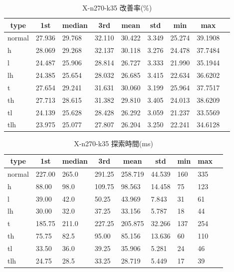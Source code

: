 \begin{table}[htbp]
    \caption{X-n270-k35 改善率(\%)}
    \begin{tabular}{|l|l|l|l|l|l|l|l|l|}\hline
    \multicolumn{1}{|c|}{\textbf{type}}
    &\multicolumn{1}{|c|}{\textbf{1st}}
    &\multicolumn{1}{c|}{\textbf{median}}
    &\multicolumn{1}{c|}{\textbf{3rd}}
    &\multicolumn{1}{c|}{\textbf{mean}}
    &\multicolumn{1}{c|}{\textbf{std}}
    &\multicolumn{1}{c|}{\textbf{min}}
    &\multicolumn{1}{c|}{\textbf{max}}\\\hline
	normal & 27.936 & 29.768 & 32.110 & 30.422 & 3.349 & 25.274 & 39.1908\\\hline
	h & 28.069 & 29.268 & 32.137 & 30.118 & 3.276 & 24.478 & 37.7484\\\hline
	l & 24.487 & 25.906 & 28.814 & 26.727 & 3.333 & 21.990 & 35.1944\\\hline
	lh & 24.385 & 25.654 & 28.032 & 26.685 & 3.415 & 22.634 & 36.6202\\\hline
	t & 27.654 & 29.241 & 31.631 & 30.060 & 3.199 & 25.964 & 37.7517\\\hline
	th & 27.713 & 28.615 & 31.382 & 29.810 & 3.405 & 24.013 & 38.6209\\\hline
	tl & 24.139 & 25.628 & 28.428 & 26.292 & 3.059 & 21.237 & 33.5569\\\hline
	tlh & 23.975 & 25.077 & 27.807 & 26.204 & 3.250 & 22.241 & 34.6128\\\hline
	\end{tabular}
\end{table}
\begin{table}[htbp]
    \caption{X-n270-k35 探索時間(ms)}
    \begin{tabular}{|l|l|l|l|l|l|l|l|l|}\hline
    \multicolumn{1}{|c|}{\textbf{type}}
    &\multicolumn{1}{|c|}{\textbf{1st}}
    &\multicolumn{1}{c|}{\textbf{median}}
    &\multicolumn{1}{c|}{\textbf{3rd}}
    &\multicolumn{1}{c|}{\textbf{mean}}
    &\multicolumn{1}{c|}{\textbf{std}}
    &\multicolumn{1}{c|}{\textbf{min}}
    &\multicolumn{1}{c|}{\textbf{max}}\\\hline
	normal & 227.00 & 265.0 & 291.25 & 258.719 & 44.539 & 160 & 335\\\hline
	h & 88.00 & 98.0 & 109.75 & 98.563 & 14.458 & 75 & 123\\\hline
	l & 39.00 & 42.0 & 50.25 & 43.969 & 7.843 & 31 & 61\\\hline
	lh & 30.00 & 32.0 & 37.25 & 33.156 & 5.787 & 18 & 44\\\hline
	t & 185.75 & 211.0 & 227.25 & 205.875 & 32.266 & 137 & 254\\\hline
	th & 75.75 & 82.5 & 95.00 & 85.156 & 13.636 & 60 & 110\\\hline
	tl & 33.50 & 36.0 & 39.25 & 35.906 & 5.281 & 24 & 46\\\hline
	tlh & 24.75 & 28.5 & 33.25 & 28.719 & 5.449 & 17 & 39\\\hline
	\end{tabular}
\end{table}
